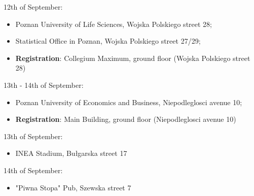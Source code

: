12th of September:

\begin{itemize}
        \item Poznan University of Life Sciences, Wojska Polskiego street 28;
        \item Statistical Office in Poznan, Wojska Polskiego street 27/29;
        \item \textbf{Registration}: Collegium Maximum, ground floor (Wojska Polskiego street 28)
\end{itemize}

13th - 14th of September:

\begin{itemize}
        \item Poznan University of Economics and Business, Niepodleglosci avenue 10;
        \item \textbf{Registration}: Main Building, ground floor (Niepodleglosci avenue 10)
\end{itemize}

13th of September:

\begin{itemize}
        \item INEA Stadium, Bułgarska street 17
\end{itemize}

14th of September: 

\begin{itemize}
        \item "Piwna Stopa" Pub, Szewska street 7
\end{itemize}

